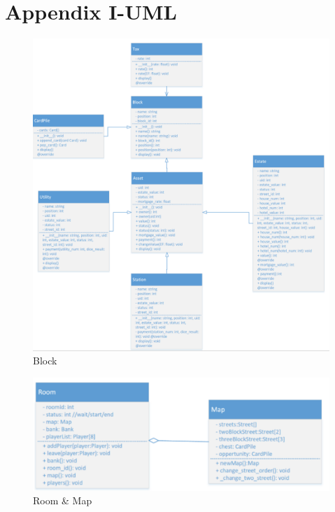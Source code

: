 \documentclass[a4paper,11pt]{article}
\begin{document}
\section*{Appendix I-UML}
\begin{figure}[H]
\includegraphics[scale=0.8]{image/Block.png}
\caption{Block}
\end{figure}
\begin{figure}[H]
\includegraphics[scale=0.7]{image/roomandmap.png}
\caption{Room \& Map}
\end{figure}
\end{document}
